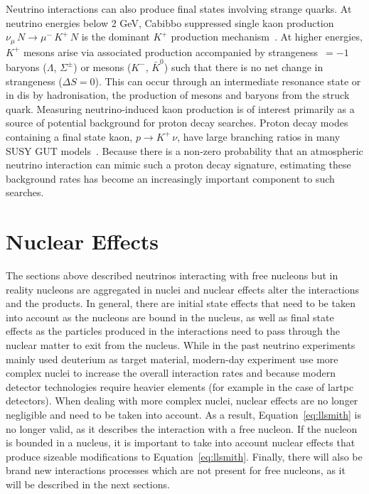 Neutrino interactions can also produce final states involving strange quarks.
At neutrino energies below 2 GeV, Cabibbo suppressed single kaon production $\nu_\mu \, N \rightarrow \mu^- \, K^+ \, N$ is the dominant $K^+$ production mechanism~\cite{minerva_kp}. At higher energies, $K^+$ mesons arise via associated production accompanied by strangeness~$=-1$ baryons ($\Lambda$, $\Sigma^{\pm}$) or mesons ($K^-$, $\bar{K}^0$) such that there is no net change in strangeness ($\Delta S = 0$). This can occur through an intermediate resonance state or in \acrshort{dis} by hadronisation, the production of mesons and baryons from the struck quark. 
Measuring neutrino-induced kaon production is of interest primarily as a source of potential background for proton decay searches. Proton decay modes containing a final state kaon, $p \rightarrow K^+ \, \nu$, have large branching ratios in many SUSY GUT models~\cite{zeller}. Because there is a non-zero probability that an atmospheric neutrino interaction can mimic such a proton decay signature, estimating these background rates has become an increasingly important component to such searches.






\section{Nuclear Effects}
\label{sec:nuclear_effects}

The sections above described neutrinos interacting with free nucleons but in reality nucleons are aggregated in nuclei and nuclear effects alter the interactions and the products. In general, there are initial state effects that need to be taken into account as the nucleons are bound in the nucleus, as well as final state effects as the particles produced in the interactions need to pass through the nuclear matter to exit from the nucleus. 
While in the past neutrino experiments mainly used deuterium as target material, modern-day experiment use more complex nuclei to increase the overall interaction rates and because modern detector technologies require heavier elements (for example in the case of \acrshort{lartpc} detectors). When dealing with more complex nuclei, nuclear effects are no longer negligible and need to be taken into account. As a result, Equation~\eqref{eq:llsmith} is no longer valid, as it describes the interaction with a free nucleon. If the nucleon is bounded in a nucleus, it is important to take into account nuclear effects that produce sizeable modifications to Equation~\eqref{eq:llsmith}.
Finally, there will also be brand new interactions processes which are not present for free nucleons, as it will be described in the next sections.



